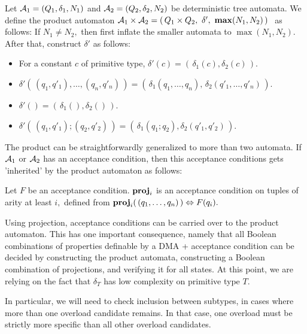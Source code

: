 \begin{definition}
   \label{Def_product_automaton}
   Let $ {\cal A}_1 = ( Q_1, \delta_1, N_1) $ and
   $ {\cal A}_2 = ( Q_2, \delta_2, N_2 ) $
   be deterministic tree automata.
   We define the product automaton
   $ {\cal A}_1 \times {\cal A}_2 =
        ( \, Q_1 \times Q_2, \ \delta', \ {\bf max}(N_1,N_2) \, ) \ $
   as follows:
   If $ N_1 \not = N_2, $ then first inflate the smaller
   automata to $ \max(N_1,N_2). $
   After that, construct $ \delta' $ as follows:
   \begin{itemize}
   \item
      For a constant $c$ of primitive type,
      $ \delta'(c) = ( \, \delta_1(c), \delta_2(c) \, ). $
   \item
      $ \delta'( \, (q_1,q'_1), \ldots, (q_n,q'_n) \, ) =
      ( \, \delta_1( q_1, \ldots, q_n), \, \delta_2( q'_1, \ldots, q'_n ) \, ). $
   \item
      $ \delta'( ) = ( \, \delta_1( ), \delta_2( ) \, ). $
   \item
      $ \delta'( \, ( q_1,q'_1); ( q_2, q'_2) \, ) =
        ( \, \delta_1( q_1; q_2), \delta_2( q'_1, q'_2) \, ). $ 
    \end{itemize}
\end{definition}
The product can be straightforwardly generalized to more than two automata.
If $ {\cal A}_1 $ or $ {\cal A}_2 $ has an acceptance condition,
then this acceptance conditions gets 'inherited' by the product automaton
as follows:
\begin{definition}
   \label{Def_acc_proj}
   Let $ F $ be an acceptance condition.
   $ {\bf proj}_i $ is an acceptance condition on tuples
   of arity at least $ i, $ defined from
   $ {\bf proj}_i( \, ( q_1, \ldots, q_n ) \, ) \Leftrightarrow
     F(q_i). $
\end{definition}
Using projection, acceptance conditions can be carried over to the 
product automaton. 
This has one important consequence, namely that
all Boolean combinations of properties definable
by a DMA + acceptance condition can be decided
by constructing the product automata, constructing
a Boolean combination of projections, and verifying it for
all states. At this point, we are relying on the fact that
$ \delta_T $ has low complexity on primitive type $ T. $ 

In particular, we will need to check inclusion between subtypes, 
in cases where more than one overload candidate remains.
In that case, one overload must be strictly more specific than
all other overload candidates.

